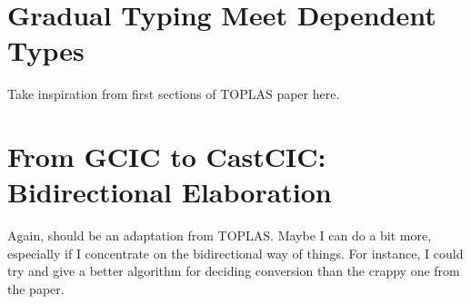 \documentclass[
  french,english,
	fontsize=10pt, %
	twoside=true, %
	open=any, %
	secnumdepth=1, %
  numbers=enddot,
]{kaobook/kaobook}
\begin{document}



\mainmatter %









\label{part:bidir}






\label{part:metacoq}





\label{part:gradual}

\chapter{Gradual Typing Meet Dependent Types}
\label{chap:gradual-dependent}

Take inspiration from first sections of TOPLAS paper here.

\chapter{From GCIC to CastCIC: Bidirectional Elaboration}
\label{chap:bidir-gradual-elab}

Again, should be an adaptation from TOPLAS. Maybe I can do a bit more, especially if
I concentrate on the bidirectional way of things. For instance, I could try and give a better algorithm for deciding conversion than the crappy one from the paper.

\end{document}
